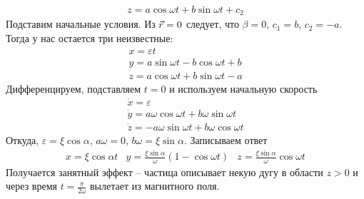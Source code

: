 \begin{solution}
\begin{equation}
\begin{array}{l}
      z = a\cos ωt + b\sin ωt +c_2
    \end{array}
  \end{equation}
  Подставим начальные условия. Из ${\vec r} = 0$ следует,
  что $β = 0$, $ c_1 = b$, $ c_2 = -a$. Тогда у нас остается три неизвестные:
  \begin{equation*}
    \begin{array}{l}
       x = εt\\
       y = a\sin ωt - b\cos ωt + b\\
       z = a\cos ωt + b\sin ωt -a
    \end{array}
  \end{equation*}
  Дифференцируем, подставляем $t = 0$ и используем начальную скорость
  \begin{equation*}
    \begin{array}{l}
      \dot x = ε\\
      \dot y = aω\cos ωt + bω\sin ωt\\
      \dot z = -aω\sin ωt + bω\cos ωt
    \end{array}
  \end{equation*}
  Откуда, $ε = ξ\cos α$, $aω = 0$, $bω = ξ\sin α$.
  Записываем ответ
  \begin{equation*}
    \begin{array}{ccc}
      x = ξ\cos α t & y = \frac{ξ\sin α}ω(1- \cos ωt)  & z = \frac{ξ\sin α}{ω}\cos ωt
    \end{array}
  \end{equation*}
  Получается занятный эффект -- частица описывает некую дугу в области
  $ z > 0$ и через время $ t= \frac{π}{2ω}$ вылетает из магнитного поля.
\end{solution}
